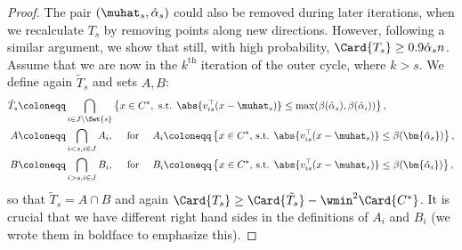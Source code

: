 \begin{proof}
The pair \((\muhat_s, \hat\alpha_s)\) could also be removed during later iterations, when we recalculate \(T_s\) by removing points along new directions. 
However, following a similar argument, we show that still, with high probability, \(\Card{T_s} \geq 0.9\hat\alpha_s n\).
Assume that we are now in the \(k^{\mathrm{th}}\) iteration of the outer cycle, where \(k > s\). We define again \(\tilde T_s\) and sets \(A, B\):
\begin{equation*}
    \begin{aligned}
        \tilde T_s &\coloneqq \bigcap_{i \in J \setminus \Set{s}} \left\{x \in C^{\ast}, \text{ s.t. } \abs{v_{is}^{\top} (x - \muhat_s)} \leq \max(\beta(\hat\alpha_s), \beta(\hat\alpha_i)) \right\},\\
        A &\coloneqq \bigcap_{i < s, i \in J} A_i, \quad \text{ for } \quad A_i \coloneqq \left\{x \in C^{\ast} \text{, s.t. } \abs{v_{is}^{\top} (x - \muhat_s)} \leq \beta(\bm{\hat\alpha_s}) \right\}, \\
        B &\coloneqq \bigcap_{i > s, i \in J} B_i, \quad \text{ for } \quad B_i \coloneqq\left\{x \in C^{\ast} \text{, s.t. } \abs{v_{is}^{\top} (x - \muhat_s)} \leq \beta(\bm{\hat\alpha_i}) \right\},
    \end{aligned}
\end{equation*}
so that \(\tilde T_s = A \cap B\) and again \(\Card{T_s} \geq \Card{\tilde T_s} - \wmin^2\Card{C^{\ast}}\). It is crucial that we have different right hand sides in the definitions of \(A_i\) and \(B_i\) (we wrote them in boldface to emphasize this).


\end{proof}
